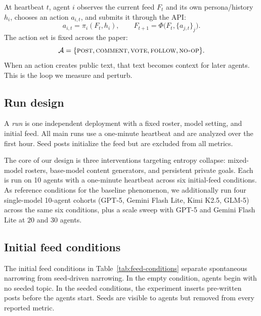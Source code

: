 \documentclass[11pt]{article}
\begin{document}
At heartbeat $t$, agent $i$ observes the current feed $F_t$ and its own persona/history $h_i$, chooses an action $a_{i,t}$, and submits it through the API:
\begin{equation}
    a_{i,t} = \pi_i(F_t, h_i), \qquad F_{t+1} = \Phi\bigl(F_t, \{a_{j,t}\}_j\bigr).
    \label{eq:loop}
\end{equation}
The action set is fixed across the paper:
\[
\mathcal{A} = \{\textsc{post}, \textsc{comment}, \textsc{vote}, \textsc{follow}, \textsc{no-op}\}.
\]
When an action creates public text, that text becomes context for later agents. This is the loop we measure and perturb.

\subsection{Run design}
\label{subsec:design}

A \emph{run} is one independent deployment with a fixed roster, model setting, and initial feed. All main runs use a one-minute heartbeat and are analyzed over the first hour. Seed posts initialize the feed but are excluded from all metrics.

The core of our design is three interventions targeting entropy collapse: mixed-model rosters, base-model content generators, and persistent private goals. Each is run on 10 agents with a one-minute heartbeat across six initial-feed conditions. As reference conditions for the baseline phenomenon, we additionally run four single-model 10-agent cohorts (GPT-5, Gemini Flash Lite, Kimi K2.5, GLM-5) across the same six conditions, plus a scale sweep with GPT-5 and Gemini Flash Lite at $20$ and $30$ agents.

\subsection{Initial feed conditions}
\label{subsec:conditions}

The initial feed conditions in Table~\ref{tab:feed-conditions} separate spontaneous narrowing from seed-driven narrowing. In the empty condition, agents begin with no seeded topic. In the seeded conditions, the experiment inserts pre-written posts before the agents start. Seeds are visible to agents but removed from every reported metric.
\end{document}

